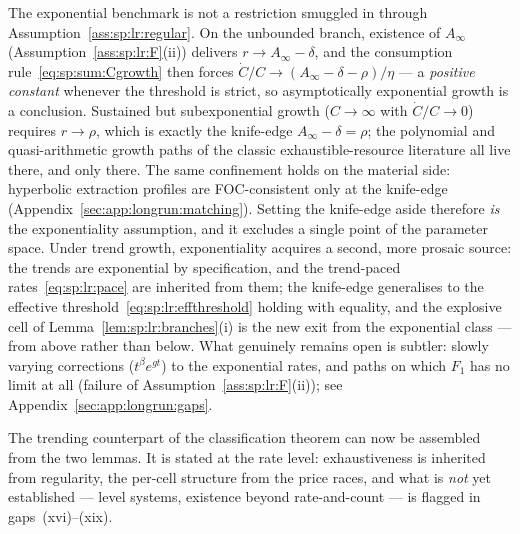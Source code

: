 \begin{remark}\label{rem:sp:lr:exponential}
The exponential benchmark is not a restriction smuggled in through
Assumption~\ref{ass:sp:lr:regular}. On the unbounded branch, existence of $A_\infty$
(Assumption~\ref{ass:sp:lr:F}(ii)) delivers $r\to A_\infty-\delta$, and the consumption
rule~\eqref{eq:sp:sum:Cgrowth} then forces $\dot C/C\to\left(A_\infty-\delta-\rho\right)/\eta$
--- a \emph{positive constant} whenever the threshold is strict, so asymptotically exponential
growth is a conclusion. Sustained but subexponential growth ($C\to\infty$ with $\dot C/C\to0$)
requires $r\to\rho$, which is exactly the knife-edge $A_\infty-\delta=\rho$; the polynomial and
quasi-arithmetic growth paths of the classic exhaustible-resource literature all live there,
and only there. The same confinement holds on the material side: hyperbolic extraction profiles
are FOC-consistent only at the knife-edge (Appendix~\ref{sec:app:longrun:matching}). Setting
the knife-edge aside therefore \emph{is} the exponentiality assumption, and it excludes a
single point of the parameter space. Under trend growth, exponentiality acquires a second,
more prosaic source: the trends are exponential by specification, and the trend-paced
rates~\eqref{eq:sp:lr:pace} are inherited from them; the knife-edge generalises to the
effective threshold~\eqref{eq:sp:lr:effthreshold} holding with equality, and the explosive
cell of Lemma~\ref{lem:sp:lr:branches}(i) is the new exit from the exponential class ---
from above rather than below. What genuinely remains open is subtler: slowly varying
corrections ($t^\beta e^{gt}$) to the exponential rates, and paths on which $F_1$ has no limit
at all (failure of Assumption~\ref{ass:sp:lr:F}(ii)); see
Appendix~\ref{sec:app:longrun:gaps}.
\end{remark}

The trending counterpart of the classification theorem can now be assembled from the two
lemmas. It is stated at the rate level: exhaustiveness is inherited from regularity, the
per-cell structure from the price races, and what is \emph{not} yet established --- level
systems, existence beyond rate-and-count --- is flagged in gaps~(xvi)--(xix).

